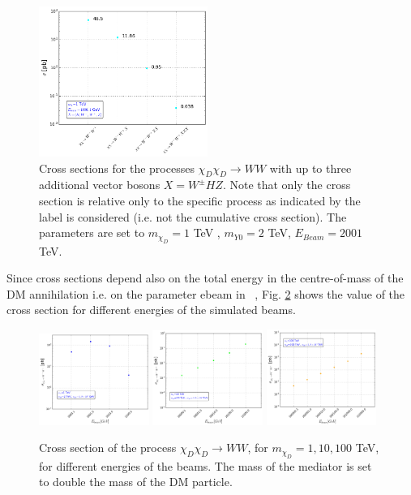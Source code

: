 \documentclass[epj,nopacs,fleqn]{svjour}
\begin{document}
\begin{figure}[!b]
	\centering
	\includegraphics[width=0.49\textwidth]{Fig/XSEC/processes_xsec_1_TeV.png}
	\caption{Cross sections for the processes $\chi_D \chi_D \rightarrow WW$ with up to three additional vector bosons $X=W^{\pm} H Z$. Note that only the cross section is relative only to the specific process as indicated by the label is considered (i.e. not the cumulative cross section). The parameters are set to $m_{\chi _D}= 1$ TeV , $m_{Y0}= 2$ TeV, $E_{Beam}=2001$ TeV.}
\label{xsec_1TeV}
\end{figure}
%
Since cross sections depend also on the total energy in the centre-of-mass of the DM annihilation i.e. on the parameter ebeam in \MG~, Fig. \ref{xsec_ebeam} shows the value of the cross section for different energies of the simulated beams.
%
\begin{figure}[!b]
	\centering
	\subfigure
	{ \includegraphics[width=0.32\textwidth]{Fig/XSEC/xsec_Ebeam_1_TeV.png}}
	\subfigure
	{ \includegraphics[width=0.32\textwidth]{Fig/XSEC/xsec_Ebeam_10_TeV.png}}
	\subfigure
	{ \includegraphics[width=0.32\textwidth]{Fig/XSEC/xsec_Ebeam_100_TeV.png}}
	\caption{Cross section of the process $\chi_D \chi_D \rightarrow WW$, for $m_{\chi _D}= 1,10,100$ TeV, for different energies of the beams. The mass of the mediator is set to double the mass of the DM particle.   }
\label{xsec_ebeam}
\end{figure}
\end{document}
